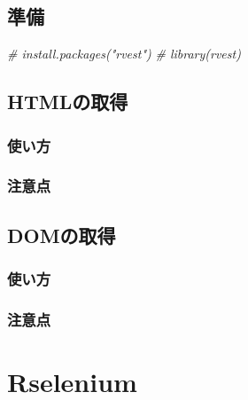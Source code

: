 \documentclass[
]{article}
\newenvironment{Shaded}{\begin{snugshade}}{\end{snugshade}}
\newcommand{\CommentTok}[1]{\textcolor[rgb]{0.56,0.35,0.01}{\textit{#1}}}
\begin{document}
\hypertarget{ux6e96ux5099-2}{%
\subsection{準備}\label{ux6e96ux5099-2}}

\begin{Shaded}
\begin{Highlighting}[]
  \CommentTok{\# install.packages("rvest")}
  \CommentTok{\# library(rvest)}
\end{Highlighting}
\end{Shaded}

\hypertarget{htmlux306eux53d6ux5f97}{%
\subsection{HTMLの取得}\label{htmlux306eux53d6ux5f97}}

\hypertarget{ux4f7fux3044ux65b9}{%
\subsubsection{使い方}\label{ux4f7fux3044ux65b9}}

\hypertarget{ux6ce8ux610fux70b9}{%
\subsubsection{注意点}\label{ux6ce8ux610fux70b9}}

\hypertarget{domux306eux53d6ux5f97}{%
\subsection{DOMの取得}\label{domux306eux53d6ux5f97}}

\hypertarget{ux4f7fux3044ux65b9-1}{%
\subsubsection{使い方}\label{ux4f7fux3044ux65b9-1}}

\hypertarget{ux6ce8ux610fux70b9-1}{%
\subsubsection{注意点}\label{ux6ce8ux610fux70b9-1}}

\hypertarget{rselenium}{%
\section{Rselenium}\label{rselenium}}
\end{document}
